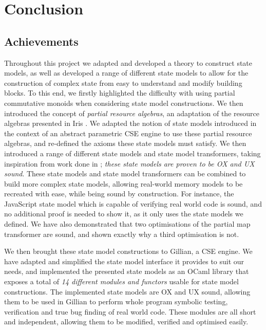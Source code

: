 \chapter{Conclusion} \label{chap:conclusion}

\section{Achievements}

Throughout this project we adapted and developed a theory to construct state models, as well as developed a range of different state models to allow for the construction of complex state from easy to understand and modify building blocks. To this end, we firstly highlighted the difficulty with using partial commutative monoids when considering state model constructions. We then introduced the concept of \emph{partial resource algebras}, an adaptation of the resource algebras presented in Iris \cite{iris}. We adapted the notion of state models introduced in the context of an abstract parametric CSE engine \cite{cse2} to use these partial resource algebras, and re-defined the axioms these state models must satisfy. We then introduced a range of different state models and state model transformers, taking inspiration from work done in \cite{iris,sacha-phd}; \emph{these state models are proven to be OX and UX sound}. These state models and state model transformers can be combined to build more complex state models, allowing real-world memory models to be recreated with ease, while being sound by construction. For instance, the JavaScript state model which is capable of verifying real world code is sound, and no additional proof is needed to show it, as it only uses the state models we defined. We have also demonstrated that two optimisations of the partial map transformer are sound, and shown exactly why a third optimisation is not.

We then brought these state model constructions to Gillian, a CSE engine. We have adapted and simplified the state model interface it provides to suit our needs, and implemented the presented state models as an OCaml library that exposes a total of \emph{14 different modules and functors} usable for state model constructions. The implemented state models are OX and UX sound, allowing them to be used in Gillian to perform whole program symbolic testing, verification and true bug finding of real world code. These modules are all short and independent, allowing them to be modified, verified and optimised easily.

